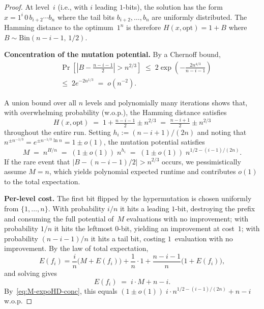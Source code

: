 \begin{proof}
At level~$i$ (i.e., with $i$ leading $1$-bits), the solution has the form
$x = 1^{i}\,0\,b_{i+2}\cdots b_n$ where the tail bits $b_{i+2},\dots,b_n$
are uniformly distributed.
The Hamming distance to the optimum~$1^n$ is therefore
$H(x,\text{opt}) = 1 + B$ where $B\sim\mathrm{Bin}(n-i-1,\,1/2)$.

\medskip
\noindent\textbf{Concentration of the mutation potential.}
By a Chernoff bound,
\begin{align*}
&\Pr\!\left[\left|B - \tfrac{n-i-1}{2}\right| > n^{2/3}\right]
\;\le\; 2\exp\!\left(-\frac{2n^{4/3}}{n-i-1}\right)
\\\;&\le\; 2e^{-2n^{1/3}}
\;=\; o(n^{-2}).
\end{align*}

A union bound over all $n$ levels and polynomially many iterations shows that,
with overwhelming probability (w.o.p.), the Hamming distance satisfies
\[
H(x,\text{opt})
\;=\; 1 + \tfrac{n-i-1}{2} \pm n^{2/3}
\;=\; \tfrac{n-i+1}{2} \pm n^{2/3}
\]
throughout the entire run.
Setting $h_i := (n-i+1)/(2n)$ and noting that
$n^{\pm n^{-1/3}} = e^{\pm n^{-1/3}\ln n} = 1 \pm o(1)$,
the mutation potential satisfies
\begin{equation}\label{eq:M-expoHD-conc}
M \;=\; n^{H/n}
  \;=\; (1\pm o(1))\;n^{h_i}
  \;=\; (1\pm o(1))\;n^{1/2-(i-1)/(2n)}.
\end{equation}
If the rare event that $|B - (n-i-1)/2| > n^{2/3}$ occurs, we
pessimistically assume $M=n$, which yields polynomial expected runtime and
contributes $o(1)$ to the total expectation.

\medskip
\noindent\textbf{Per-level cost.}
The first bit flipped by the hypermutation is chosen uniformly from
$\{1,\dots,n\}$.  With probability $i/n$ it hits a leading $1$-bit,
destroying the prefix and consuming the full potential of~$M$ evaluations
with no improvement; with probability $1/n$ it hits the leftmost $0$-bit,
yielding an improvement at cost~$1$; with probability $(n-i-1)/n$ it hits
a tail bit, costing $1$~evaluation with no improvement.
By the law of total expectation,
\[
E(f_i)
= \frac{i}{n}\bigl(M+E(f_i)\bigr)
  +\frac{1}{n}\cdot 1
  +\frac{n-i-1}{n}\bigl(1+E(f_i)\bigr),
\]
and solving gives
\begin{equation}\label{eq:Efi-expoHD}
E(f_i) \;=\; i\cdot M + n - i.
\end{equation}
By~\eqref{eq:M-expoHD-conc}, this equals
$(1\pm o(1))\;i\cdot n^{1/2-(i-1)/(2n)} + n - i$ w.o.p.


\end{proof}
